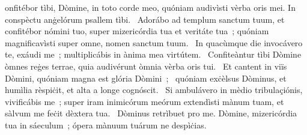 \psalmChapterWithInscription{}
{ }
{%
onfitébor tìbi, Dòmine, in toto corde meo, quóniam audivìsti vèrba oris mei. In conspèctu anġelórum psallem tìbi. 
~Adorábo ad templum sanctum tuum, et confitébor nómini tuo, super mizericórdia tua et veritáte tua~; quóniam magnificavìsti super omne, nomen sanctum tuum. 
~In quacùmque die invocávero te, exáudi me~; multiplicábis in ànima mea virtútem. 
~Confiteàntur tìbi Dòmine òmnes reġes terrae, quia audivérunt òmnia vèrba oris tui. 
~Et cantent in viïs Dòmini, quóniam magna est glória Dòmini~; 
~quóniam exċèlsus Dòminus, et humìlia rèspiċit, et alta a longe cognóscit. 
~Si ambulávero in mèdio tribulaçiónis, vivificábis me~; super iram inimicórum meórum extendìsti mànum tuam, et sàlvum me feċit dèxtera tua. 
~Dòminus retrìbuet pro me. Dòmine, mizericórdia tua in sáeculum~; ópera mànuum tuárum ne despìċias. 
}
